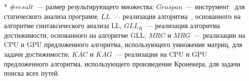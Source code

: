 \begin{table} [htbp]
\begin{threeparttable}
{\begin{tablenotes}
            \item[*] $\#\textit{result}$~--- размер результирующего множества; $\textit{Graspan}$~--- инструмент~\cite{graspan} для статического анализа программ; $\textit{LL}$~--- реализация алгоритма~\cite{medeiros2018efficient}, основанного на алгоритме синтаксического анализа LL, $\textit{GLL}_{\textit{R}}$~--- реализация алгоритма~\cite{grigorev2017context} достижимости, основанного на алгоритме GLL; $\textit{MRC}$ и $\textit{MRG}$~--- реализации на CPU и GPU предложенного алгоритма, использующего умножение матриц, для задачи достижимости; $\textit{KAC}$ и $\textit{KAG}$~--- реализации на CPU и GPU предложенного алгоритма, использующего произведение Кронекера, для задачи поиска всех путей.
        \end{tablenotes}    }
    \end{threeparttable}
\end{table}


